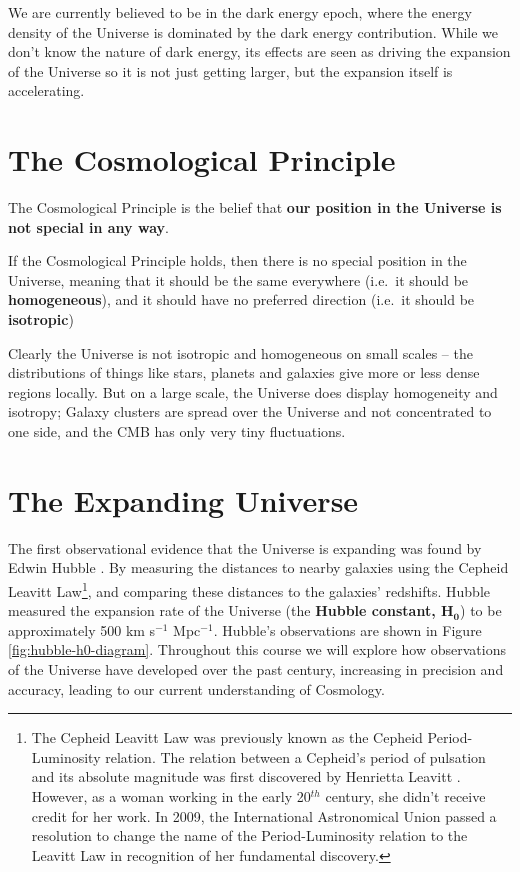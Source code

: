 \documentclass[]{book}
\let\rmarkdownfootnote\footnote%
\def\footnote{\protect\rmarkdownfootnote}
\begin{document}
We are currently believed to be in the dark energy epoch, where the
energy density of the Universe is dominated by the dark energy
contribution. While we don't know the nature of dark energy, its effects
are seen as driving the expansion of the Universe so it is not just
getting larger, but the expansion itself is accelerating.

\hypertarget{sec:cosmoprinciple}{%
\section{The Cosmological Principle}\label{sec:cosmoprinciple}}

The Cosmological Principle is the belief that \textbf{our position in the
Universe is not special in any way}.

If the Cosmological Principle holds, then there is no special position
in the Universe, meaning that it should be the same everywhere (i.e.~it
should be \textbf{homogeneous}), and it should have no preferred direction
(i.e.~it should be \textbf{isotropic})

Clearly the Universe is not isotropic and homogeneous on small scales --
the distributions of things like stars, planets and galaxies give more
or less dense regions locally. But on a large scale, the Universe does
display homogeneity and isotropy; Galaxy clusters are spread over the
Universe and not concentrated to one side, and the CMB has only very
tiny fluctuations.

\hypertarget{sec:expanding_intro}{%
\section{The Expanding Universe}\label{sec:expanding_intro}}

The first observational evidence that the Universe is expanding was
found by Edwin Hubble \citep{1929Hubble}. By measuring the distances
to nearby galaxies using the Cepheid Leavitt Law\footnote{The Cepheid Leavitt Law was previously known as the Cepheid
  Period-Luminosity relation. The relation between a Cepheid's period
  of pulsation and its absolute magnitude was first discovered by
  Henrietta Leavitt \citep{1912Leavitt}. However, as a woman
  working in the early 20\(^{th}\) century, she didn't receive credit
  for her work. In 2009, the International Astronomical Union passed a
  resolution to change the name of the Period-Luminosity relation to
  the Leavitt Law in recognition of her fundamental discovery.}, and comparing
these distances to the galaxies' redshifts. Hubble measured the
expansion rate of the Universe (the \textbf{Hubble constant, \(\mathbf{H_0}\)})
to be approximately 500 km s\(^{-1}\) Mpc\(^{-1}\). Hubble's observations
are shown in
Figure \ref{fig:hubble-h0-diagram}. Throughout this course we will
explore how observations of the Universe have developed over the past
century, increasing in precision and accuracy, leading to our current
understanding of Cosmology.
\end{document}
